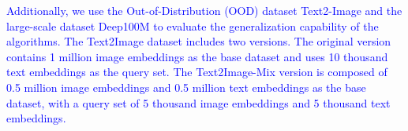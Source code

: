 \documentclass[sigconf, nonacm]{acmart}
\begin{document}
{	\textcolor{blue}{Additionally, we use the Out-of-Distribution (OOD) dataset Text2-Image and the large-scale dataset Deep100M to evaluate the generalization capability of the algorithms. The Text2Image dataset includes two versions. The original version contains 1 million image embeddings as the base dataset and uses 10 thousand text embeddings as the query set. The Text2Image-Mix version is composed of 0.5 million image embeddings and 0.5 million text embeddings as the base dataset, with a query set of 5 thousand image embeddings and 5 thousand text embeddings.}
	

	
	
	
	
	
}
\end{document}
